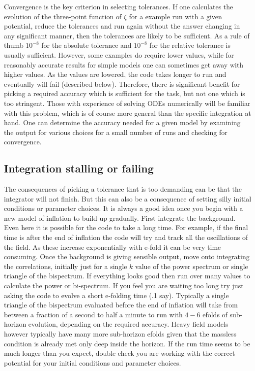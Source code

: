 \documentclass[10pt,
amsmath,amssymb,
aps,prd,nofootinbib,eqsecnum,a4paper]{revtex4}
\begin{document}
Convergence is the key criterion in selecting tolerances. If one calculates the evolution of the three-point 
function of $\zeta$ for a example run with a given potential, reduce the tolerances and run again without the answer 
changing in any significant manner, then the tolerances are likely to be sufficient.  As a rule of thumb 
$10^{-8}$ for the absolute tolerance and $10^{-8}$ for the relative tolerance is usually sufficient. 
However, some examples do require lower values, while for reasonably accurate results for simple models 
one can sometimes get away with higher values. As the values 
are lowered,  the code takes longer to run and eventually will fail (described below). Therefore, 
there is significant benefit for picking a required accuracy which is sufficient for the task, but not one which is too 
stringent. Those with experience of solving ODEs numerically will be familiar with this problem, which is of course 
more general than the specific integration at hand. One can determine the accuracy needed for a given model 
by examining the output for various choices for a small number of runs and checking for convergence.

\subsection{Integration stalling or failing} 

The consequences of picking a tolerance that is too demanding can be that the integrator will not finish. 
But this can also be a consequence of setting silly initial conditions or parameter choices. It is always a good idea 
once you begin with a new model of inflation to build up gradually. First integrate the background. Even here it 
is possible for the code to take a long time. For example, if the final time is after the end of inflation the code will 
try and  track all the oscillations of the field. As these increase exponentially with e-fold it 
can be very time consuming. 
Once the background is giving sensible output, move onto integrating the correlations, 
initially just for a 
single $k$ value of the power spectrum or single triangle of the bispectrum. If 
everything looks good then run over many values to calculate the power or bi-spectrum. If you feel you are waiting too long try just asking 
the code to evolve 
a short e-folding time (.1 say). Typically a single triangle of the bispectrum evaluated before the end of 
inflation will take 
from between a fraction of a second to half a minute to run with $4-6$ efolds of 
sub-horizon evolution, depending on the required accuracy. Heavy field models however typically have many more sub-horizon efolds given that the massless condition is already met only deep inside the horizon.  If the run time seems to be much longer than you expect, double check 
you are working  
with the correct potential for your initial conditions and parameter choices.
\end{document}
